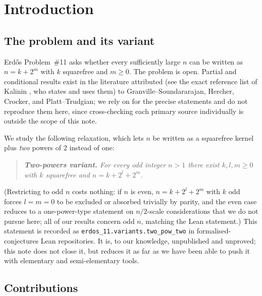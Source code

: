\documentclass[11pt]{article}
\theoremstyle{plain}
\theoremstyle{definition}
\theoremstyle{remark}
\begin{document}
\tableofcontents

\section{Introduction}

\subsection{The problem and its variant}

Erd\H{o}s Problem~\#11 \cite{erdosproblems11} asks whether every sufficiently
large $n$ can be written as $n=k+2^m$ with $k$ squarefree and $m\ge0$. The
problem is open. Partial and conditional results exist in the
literature attributed (see the exact reference list of Kalinin
\cite{Kalinin2026}, who states and uses them) to Granville--Soundararajan,
Hercher, Crocker, and Platt--Trudgian; we rely on \cite{Kalinin2026} for the
precise statements and do not reproduce them here, since cross-checking each
primary source individually is outside the scope of this note.

We study the following relaxation, which lets $n$ be written as a squarefree
kernel plus \emph{two} powers of $2$ instead of one:

\begin{quote}\itshape
\textbf{Two-powers variant.} For every odd integer $n>1$ there exist
$k,l,m\ge0$ with $k$ squarefree and $n=k+2^l+2^m$.
\end{quote}

(Restricting to odd $n$ costs nothing: if $n$ is even, $n=k+2^l+2^m$ with $k$
odd forces $l=m=0$ to be excluded or absorbed trivially by parity, and the
even case reduces to a one-power-type statement on $n/2$-scale considerations
that we do not pursue here; all of our results concern odd $n$, matching the
Lean statement.) This statement is recorded as
\texttt{erdos\_11.variants.two\_pow\_two} in formalised-conjectures Lean
repositories. It is, to our knowledge, unpublished and unproved; this note
does not close it, but reduces it as far as we have been able to push it with
elementary and semi-elementary tools.

\subsection{Contributions}
\end{document}
